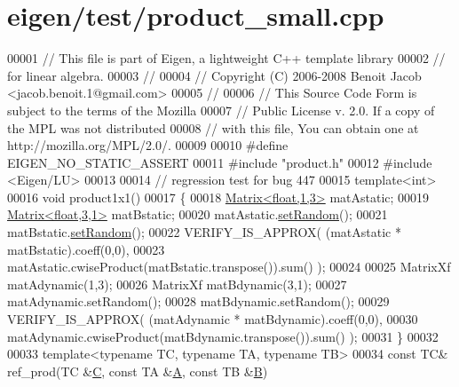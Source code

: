 \hypertarget{eigen_2test_2product__small_8cpp_source}{}\section{eigen/test/product\+\_\+small.cpp}
\label{eigen_2test_2product__small_8cpp_source}

\begin{DoxyCode}
00001 \textcolor{comment}{// This file is part of Eigen, a lightweight C++ template library}
00002 \textcolor{comment}{// for linear algebra.}
00003 \textcolor{comment}{//}
00004 \textcolor{comment}{// Copyright (C) 2006-2008 Benoit Jacob <jacob.benoit.1@gmail.com>}
00005 \textcolor{comment}{//}
00006 \textcolor{comment}{// This Source Code Form is subject to the terms of the Mozilla}
00007 \textcolor{comment}{// Public License v. 2.0. If a copy of the MPL was not distributed}
00008 \textcolor{comment}{// with this file, You can obtain one at http://mozilla.org/MPL/2.0/.}
00009 
00010 \textcolor{preprocessor}{#define EIGEN\_NO\_STATIC\_ASSERT}
00011 \textcolor{preprocessor}{#include "product.h"}
00012 \textcolor{preprocessor}{#include <Eigen/LU>}
00013 
00014 \textcolor{comment}{// regression test for bug 447}
00015 \textcolor{keyword}{template}<\textcolor{keywordtype}{int}>
00016 \textcolor{keywordtype}{void} product1x1()
00017 \{
00018   \hyperlink{group___core___module_class_eigen_1_1_matrix}{Matrix<float,1,3>} matAstatic;
00019   \hyperlink{group___core___module_class_eigen_1_1_matrix}{Matrix<float,3,1>} matBstatic;
00020   matAstatic.\hyperlink{class_eigen_1_1_plain_object_base_af0e576a0e1aefc9ee346de44cc352ba3}{setRandom}();
00021   matBstatic.\hyperlink{class_eigen_1_1_plain_object_base_af0e576a0e1aefc9ee346de44cc352ba3}{setRandom}();
00022   VERIFY\_IS\_APPROX( (matAstatic * matBstatic).coeff(0,0), 
00023                     matAstatic.cwiseProduct(matBstatic.transpose()).sum() );
00024 
00025   MatrixXf matAdynamic(1,3);
00026   MatrixXf matBdynamic(3,1);
00027   matAdynamic.setRandom();
00028   matBdynamic.setRandom();
00029   VERIFY\_IS\_APPROX( (matAdynamic * matBdynamic).coeff(0,0), 
00030                     matAdynamic.cwiseProduct(matBdynamic.transpose()).sum() );
00031 \}
00032 
00033 \textcolor{keyword}{template}<\textcolor{keyword}{typename} TC, \textcolor{keyword}{typename} TA, \textcolor{keyword}{typename} TB>
00034 \textcolor{keyword}{const} TC& ref\_prod(TC &\hyperlink{group___core___module}{C}, \textcolor{keyword}{const} TA &\hyperlink{group___core___module_class_eigen_1_1_matrix}{A}, \textcolor{keyword}{const} TB &\hyperlink{group___core___module_class_eigen_1_1_matrix}{B})

\end{DoxyCode}
